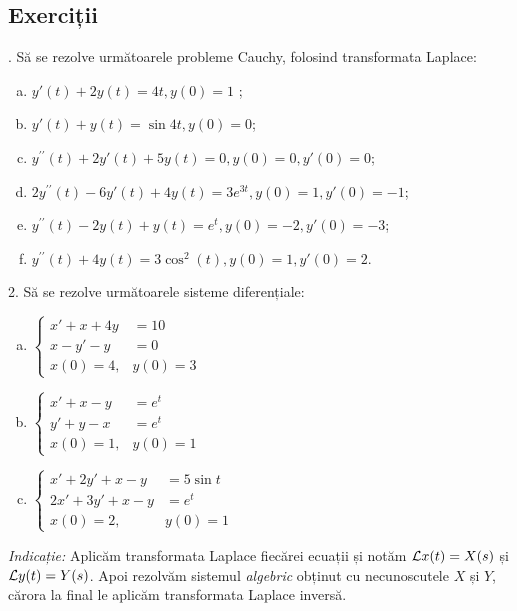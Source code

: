 \vspace{1cm}


\subsection{Exerciții}

\indent{}. Să se rezolve următoarele probleme Cauchy, folosind transformata
Laplace:
\begin{enumerate}[(a)]
\item $ y'(t) + 2y(t) = 4t, y(0) = 1 $ ;
\item $ y'(t) + y(t) = \sin 4t, y(0) = 0 $;
\item $ y^{\prime\prime}(t) + 2y'(t) + 5y(t) = 0, y(0) = 0, y'(0) = 0 $;
\item $ 2y^{\prime\prime}(t) - 6y'(t) + 4y(t) = 3e^{3t}, y(0) = 1, y'(0) = -1 $;
\item $ y^{\prime\prime}(t) - 2y(t) + y(t) = e^t, y(0) = -2, y'(0) = -3 $;
\item $ y^{\prime\prime}(t) + 4y(t) = 3\cos^2(t), y(0) = 1, y'(0) = 2 $.  
\end{enumerate}


\vspace{1cm}

2. Să se rezolve următoarele sisteme diferențiale:
\begin{enumerate}[(a)]
\item $
  \begin{cases}
    x' + x + 4y &= 10 \\
    x - y' - y &= 0 \\
    x(0) = 4, & y(0) = 3
  \end{cases}
  $
\item $
  \begin{cases}
    x' + x - y &= e^t \\
    y' + y - x &= e^t \\
    x(0) = 1, & y(0) = 1
  \end{cases}
  $
\item $
  \begin{cases}
    x' + 2y' + x - y &= 5 \sin t \\
    2x' + 3y' + x - y &= e^t \\
    x(0) = 2, & y(0) = 1
  \end{cases}
  $
\end{enumerate}

\emph{Indicație:} Aplicăm transformata Laplace fiecărei ecuații
și notăm $ \mathcal{L} x(t) = X(s) $ și $ \mathcal{L} y(t) = Y(s) $. Apoi rezolvăm sistemul
\emph{algebric} obținut cu necunoscutele $ X $ și $ Y $, cărora la final le
aplicăm transformata Laplace inversă.

